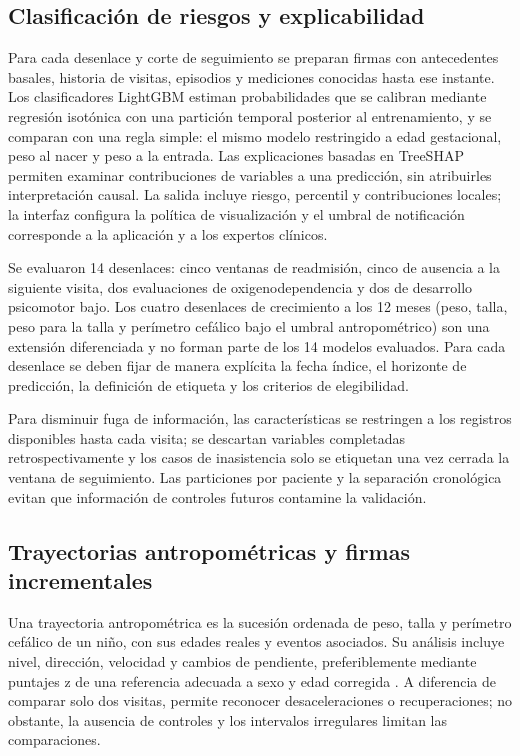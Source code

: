 \documentclass[letterpaper,10pt]{article}
\begin{document}
\subsection{Clasificación de riesgos y explicabilidad}

Para cada desenlace y corte de seguimiento se preparan firmas con antecedentes basales, historia de visitas, episodios y mediciones conocidas hasta ese instante. Los clasificadores LightGBM \cite{ke2017} estiman probabilidades que se calibran mediante regresión isotónica \cite{zadrozny2002} con una partición temporal posterior al entrenamiento, y se comparan con una regla simple: el mismo modelo restringido a edad gestacional, peso al nacer y peso a la entrada. Las explicaciones basadas en TreeSHAP \cite{lundberg2017,lundberg2020} permiten examinar contribuciones de variables a una predicción, sin atribuirles interpretación causal. La salida incluye riesgo, percentil y contribuciones locales; la interfaz configura la política de visualización y el umbral de notificación corresponde a la aplicación y a los expertos clínicos.

Se evaluaron 14 desenlaces: cinco ventanas de readmisión, cinco de ausencia a la siguiente visita, dos evaluaciones de oxigenodependencia y dos de desarrollo psicomotor bajo. Los cuatro desenlaces de crecimiento a los 12 meses (peso, talla, peso para la talla y perímetro cefálico bajo el umbral antropométrico) son una extensión diferenciada y no forman parte de los 14 modelos evaluados. Para cada desenlace se deben fijar de manera explícita la fecha índice, el horizonte de predicción, la definición de etiqueta y los criterios de elegibilidad.

Para disminuir fuga de información, las características se restringen a los registros disponibles hasta cada visita; se descartan variables completadas retrospectivamente y los casos de inasistencia solo se etiquetan una vez cerrada la ventana de seguimiento. Las particiones por paciente y la separación cronológica evitan que información de controles futuros contamine la validación.

\subsection{Trayectorias antropométricas y firmas incrementales}

Una trayectoria antropométrica es la sucesión ordenada de peso, talla y perímetro cefálico de un niño, con sus edades reales y eventos asociados. Su análisis incluye nivel, dirección, velocidad y cambios de pendiente, preferiblemente mediante puntajes z de una referencia adecuada a sexo y edad corregida \cite{villar2015,fenton2013}. A diferencia de comparar solo dos visitas, permite reconocer desaceleraciones o recuperaciones; no obstante, la ausencia de controles y los intervalos irregulares limitan las comparaciones.
\end{document}
